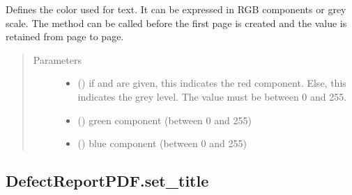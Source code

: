 \documentclass[letterpaper,10pt,english]{sphinxmanual}
\begin{document}
\begin{fulllineitems}
\begin{fulllineitems}
\label{\detokenize{generated/quality_assessment.quality_pdf_report.DefectReportPDF.set_text_color:quality_assessment.quality_pdf_report.DefectReportPDF.set_text_color}}
\sphinxAtStartPar
Defines the color used for text.
It can be expressed in RGB components or grey scale.
The method can be called before the first page is created and the value is retained from page to page.
\begin{quote}\begin{description}
\item[{Parameters}] \leavevmode\begin{itemize}
\item {} 
\sphinxAtStartPar
{} () \textendash{} if  and  are given, this indicates the red component.
Else, this indicates the grey level. The value must be between 0 and 255.

\item {} 
\sphinxAtStartPar
{} () \textendash{} green component (between 0 and 255)

\item {} 
\sphinxAtStartPar
{} () \textendash{} blue component (between 0 and 255)

\end{itemize}

\end{description}\end{quote}

\end{fulllineitems}



\subsection{DefectReportPDF.set\_title}
\label{\detokenize{generated/quality_assessment.quality_pdf_report.DefectReportPDF.set_title:defectreportpdf-set-title}}\label{\detokenize{generated/quality_assessment.quality_pdf_report.DefectReportPDF.set_title::doc}}


\end{fulllineitems}
\end{document}
